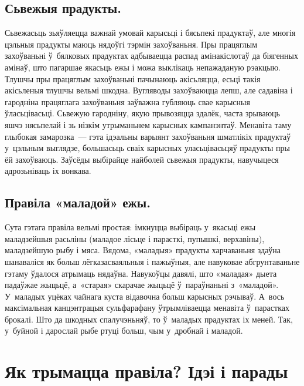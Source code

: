 \subsection{Сьвежыя прадукты.}
Сьвежасьць зьяўляецца важнай умовай карысьці і бясьпекі прадуктаў, але многія цэльныя прадукты маюць нядоўгі тэрмін захоўваньня. Пры працяглым захоўваньні ў~бялковых прадуктах адбываецца распад амінакіслотаў да біягенных амінаў, што пагаршае якасьць ежы і можа выклікаць непажаданую рэакцыю. Тлушчы пры працяглым захоўваньні пачынаюць акісьляцца, есьці такія акісьленыя тлушчы вельмі шкодна. Вугляводы захоўваюцца лепш, але садавіна і гародніна працяглага захоўваньня заўважна губляюць свае карысныя ўласьцівасьці. Сьвежую гародніну, якую прывозяцца здалёк, часта зрываюць яшчэ нясьпелай і зь нізкім утрыманьнем карысных кампанэнтаў. Менавіта таму глыбокая замарозка~--- гэта ідэальны варыянт захоўваньня шматлікіх прадуктаў у~цэльным выглядзе, большасьць сваіх карысных уласьцівасьцяў прадукты пры ёй захоўваюць. Заўсёды выбірайце найболей сьвежыя прадукты, навучыцеся адрозьніваць іх вонкава.

\subsection{Правіла «маладой» ежы.}
Сута гэтага правіла вельмі простая: імкнуцца выбіраць у~якасьці ежы маладзейшыя расьліны (маладое лісьце і парасткі, пупышкі, верхавіны), маладзейшую рыбу і мяса. Вядома, «маладыя» прадукты харчаваньня здаўна шанаваліся як больш лёгказасваяльныя і пажыўныя, але навуковае абгрунтаваньне гэтаму ўдалося атрымаць нядаўна. Навукоўцы давялі, што «маладая» дыета падаўжае жыцьцё, а~«старая» скарачае жыцьцё ў~параўнаньні з~«маладой». У~маладых уцёках чайнага куста відавочна больш карысных рэчываў. А~вось максімальная канцэнтрацыя сульфарафану ўтрымліваецца менавіта ў~парастках брокалі. Што да шкодных спалучэньняў, то ў~маладых прадуктах іх меней. Так, у~буйной і дарослай рыбе ртуці больш, чым у~дробнай і маладой.


\section{Як трымацца правіла? Ідэі і парады}

